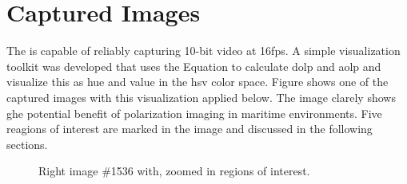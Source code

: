 \section{Captured Images}
The \sr is capable of reliably capturing 10-bit video at 16fps.
A simple visualization toolkit was developed that uses the Equation \todo
to calculate \gls{dolp} and \gls{aolp} and visualize this as hue and value in the \gls{hsv} color space.
Figure shows one of the captured images with this visualization applied below.
The image clarely shows ghe potential benefit of polarization imaging in maritime environments.
Five reagions of interest are marked in the image and discussed in the following sections.

\begin{figure}[H]
    \centering
    \caption{Right image \#1536 with, zoomed in regions of interest.}
    \label{fig:picture_1536}
\end{figure}

